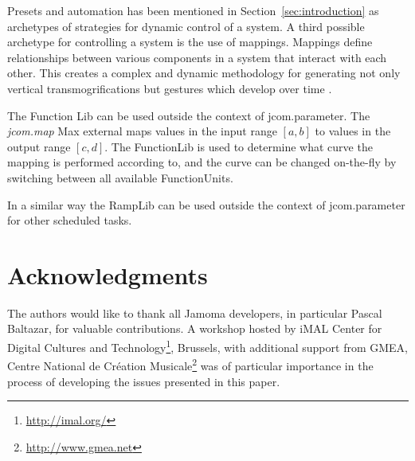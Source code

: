 \documentclass{article}
\begin{document}
Presets and automation has been mentioned in Section~\ref{sec:introduction} as archetypes of strategies for dynamic control of a system. A third possible archetype for controlling a system is the use of mappings. Mappings define relationships between various components in a system that interact with each other. This creates a complex and dynamic methodology for generating not only vertical transmogrifications but gestures which develop over time \cite{Hunt:2003,Nort:2006}.

The Function Lib can be used outside the context of jcom.parameter. The \emph{jcom.map} Max external maps values in the input range $[a,b]$ to values in the output range $[c,d]$. The FunctionLib is used to determine what curve the mapping is performed according to, and the curve can be changed on-the-fly by switching between all available FunctionUnits. 

In a similar way the RampLib can be used outside the context of jcom.parameter for other scheduled tasks.








\section{Acknowledgments} %

The authors would like to thank all Jamoma developers, in particular Pascal Baltazar, for valuable contributions. A workshop hosted by iMAL Center for Digital Cultures and Technology\footnote{\url{http://imal.org/}}, Brussels, with additional support from GMEA, Centre National de Cr\'eation Musicale\footnote{\url{http://www.gmea.net}} was of particular importance in the process of developing the issues presented in this paper.

%

%
\end{document}
